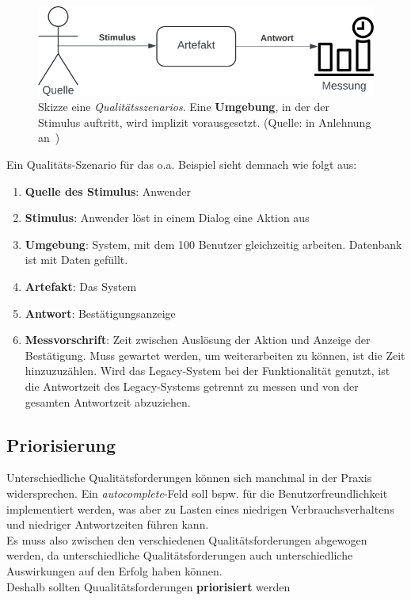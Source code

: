 \begin{figure}
    \centering
    \includegraphics[scale=0.4]{part four/Qualität/img/qualitätsszenario}
    \caption{Skizze eine \textit{Qualitätsszenarios}. Eine \textbf{Umgebung}, in der der Stimulus auftritt, wird implizit vorausgesetzt. (Quelle: in Anlehnung an~\cite[Abb. 1.2, 4]{Wed09c})}
    \label{fig:qualitätsszenario}
\end{figure}


\noindent
Ein Qualitäts-Szenario für das o.a. Beispiel sieht demnach wie folgt aus:

\begin{enumerate}
    \item \textbf{Quelle des Stimulus}: Anwender
    \item \textbf{Stimulus}: Anwender löst in einem Dialog eine Aktion aus
    \item \textbf{Umgebung}: System, mit dem 100 Benutzer gleichzeitig arbeiten. Datenbank ist mit Daten gefüllt.
    \item \textbf{Artefakt}: Das System
    \item \textbf{Antwort}: Bestätigungsanzeige
    \item \textbf{Messvorschrift}: Zeit zwischen Auslösung der Aktion und Anzeige der Bestätigung. Muss gewartet werden, um weiterarbeiten zu können, ist die Zeit hinzuzuzählen. Wird das Legacy-System bei der Funktionalität genutzt, ist die Antwortzeit des Legacy-Systems getrennt zu messen und von der gesamten Antwortzeit abzuziehen.
\end{enumerate}

\subsection*{Priorisierung}
Unterschiedliche Qualitätsforderungen können sich manchmal in der Praxis widersprechen. Ein \textit{autocomplete}-Feld soll bspw. für die Benutzerfreundlichkeit implementiert werden, was aber zu Lasten eines niedrigen Verbrauchsverhaltens und niedriger Antwortzeiten führen kann.\\
Es muss also zwischen den verschiedenen Qualitätsforderungen abgewogen werden, da unterschiedliche Qualitätsforderungen auch unterschiedliche Auswirkungen auf den Erfolg haben können.\\
Deshalb sollten Quualitätsforderungen \textbf{priorisiert} werden

